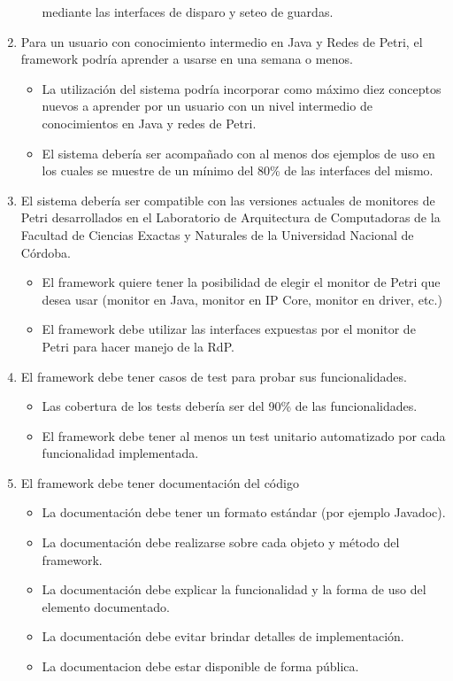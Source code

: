 \begin{enumerate}
\begin{itemize}
            mediante las interfaces de disparo y seteo de guardas.
        \end{itemize}
    \item Para un usuario con conocimiento intermedio en Java y Redes de Petri, el
    framework podría aprender a usarse en una semana o menos.
        \begin{itemize}
            \item La utilización del sistema podría incorporar como máximo diez
            conceptos nuevos a aprender por un usuario con un nivel intermedio
            de conocimientos en Java y redes de Petri.
            \item El sistema debería ser acompañado con al menos dos ejemplos de uso
            en los cuales se muestre de un mínimo del 80\% de las interfaces del
            mismo.
        \end{itemize}
    \item El sistema debería ser compatible con las versiones actuales de
    monitores de Petri desarrollados en el Laboratorio de Arquitectura de Computadoras de la
    Facultad de Ciencias Exactas y Naturales de la Universidad Nacional de Córdoba.
        \begin{itemize}
            \item El framework quiere tener la posibilidad de elegir el monitor de
            Petri que desea usar (monitor en Java, monitor en IP Core, monitor en
            driver, etc.)
            \item El framework debe utilizar las interfaces expuestas por el monitor
            de Petri para hacer manejo de la RdP.
        \end{itemize}
    \item El framework debe tener casos de test para probar sus funcionalidades.
        \begin{itemize}
            \item Las cobertura de los tests debería ser del 90\% de las
            funcionalidades.
            \item El framework debe tener al menos un test unitario automatizado
            por cada funcionalidad implementada.
        \end{itemize}
     \item El framework debe tener documentación del código
        \begin{itemize}
          \item La documentación debe tener un formato estándar (por ejemplo
          Javadoc).
          \item La documentación debe realizarse sobre cada objeto y método del
          framework.
          \item La documentación debe explicar la funcionalidad y la forma de
          uso del elemento documentado. 
          \item La documentación debe evitar brindar detalles de implementación.
          \item La documentacion debe estar disponible de forma pública.
        \end{itemize}
\end{enumerate}
